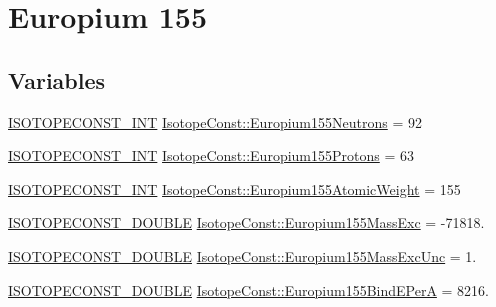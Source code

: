 \hypertarget{group___isotope_const-_europium-_eu155}{}\section{Europium 155}
\label{group___isotope_const-_europium-_eu155}
\subsection*{Variables}
\begin{DoxyCompactItemize}
\item 
\mbox{\hyperlink{group___isotope_const-_macros_ga5f18360b3e99483a35c32d789e62621c}{I\+S\+O\+T\+O\+P\+E\+C\+O\+N\+S\+T\+\_\+\+I\+NT}} \mbox{\hyperlink{group___isotope_const-_europium-_eu155_ga861bbff5504313831ddcfaa08d33e618}{Isotope\+Const\+::\+Europium155\+Neutrons}} = 92
\item 
\mbox{\hyperlink{group___isotope_const-_macros_ga5f18360b3e99483a35c32d789e62621c}{I\+S\+O\+T\+O\+P\+E\+C\+O\+N\+S\+T\+\_\+\+I\+NT}} \mbox{\hyperlink{group___isotope_const-_europium-_eu155_ga223edb3f2eff0d787c79cb2f433d0c6d}{Isotope\+Const\+::\+Europium155\+Protons}} = 63
\item 
\mbox{\hyperlink{group___isotope_const-_macros_ga5f18360b3e99483a35c32d789e62621c}{I\+S\+O\+T\+O\+P\+E\+C\+O\+N\+S\+T\+\_\+\+I\+NT}} \mbox{\hyperlink{group___isotope_const-_europium-_eu155_ga4d3c531d3922a423b1b4d5c62b0a1071}{Isotope\+Const\+::\+Europium155\+Atomic\+Weight}} = 155
\item 
\mbox{\hyperlink{group___isotope_const-_macros_ga8f45a7272ce02c0b4c65c44636ed719a}{I\+S\+O\+T\+O\+P\+E\+C\+O\+N\+S\+T\+\_\+\+D\+O\+U\+B\+LE}} \mbox{\hyperlink{group___isotope_const-_europium-_eu155_gaf99fef43a8d2031d842fd48cfcff701f}{Isotope\+Const\+::\+Europium155\+Mass\+Exc}} = -\/71818.
\item 
\mbox{\hyperlink{group___isotope_const-_macros_ga8f45a7272ce02c0b4c65c44636ed719a}{I\+S\+O\+T\+O\+P\+E\+C\+O\+N\+S\+T\+\_\+\+D\+O\+U\+B\+LE}} \mbox{\hyperlink{group___isotope_const-_europium-_eu155_gabe0c9dc0f9c3633f8cc5ec0e500853fe}{Isotope\+Const\+::\+Europium155\+Mass\+Exc\+Unc}} = 1.
\item 
\mbox{\hyperlink{group___isotope_const-_macros_ga8f45a7272ce02c0b4c65c44636ed719a}{I\+S\+O\+T\+O\+P\+E\+C\+O\+N\+S\+T\+\_\+\+D\+O\+U\+B\+LE}} \mbox{\hyperlink{group___isotope_const-_europium-_eu155_ga87440727ed636b9c13849bea8015653a}{Isotope\+Const\+::\+Europium155\+Bind\+E\+PerA}} = 8216.
\item 

\end{DoxyCompactItemize}
